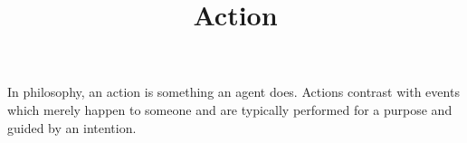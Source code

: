 \documentclass[a4paper]{article}
\title{Action}
\date{}
\begin{document}
\maketitle
    In philosophy, an action is something an agent does. Actions contrast with events which merely happen to someone and are typically performed for a purpose and guided by an intention. 
\end{document}
